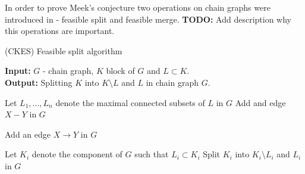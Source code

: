 %
%
%


In order to prove Meek's conjecture two operations on chain graphs were introduced in \cite{CKES} - feasible split and feasible merge.
\textbf{TODO:} Add description why this operations are important.


\begin{algorithm}
	\caption{(CKES) Feasible split algorithm}

	\textbf{Input:} $G$ - chain graph, $K$ block of $G$ and $L \subset K$. \\
	\textbf{Output:} Splitting $K$ into $K \setminus L$ and $L$ in chain graph $G$.

	\begin{algorithmic}[1]
			\State Let $L_1, \dots, L_n$ denote the maximal connected subsets of $L$ in $G$
					\State Add and edge $X - Y$ in $G$
				\EndFor

					\State Add an edge $X \rightarrow Y$ in $G$
				\EndFor
			\EndFor


				\State Let $K_i$ denote the component of $G$ such that $L_i \subset K_i$
					\State Split $K_i$ into $K_i \setminus L_i$ and $L_i$ in $G$
				\EndIf
			\EndFor
		\EndProcedure
	\end{algorithmic}

\end{algorithm}






